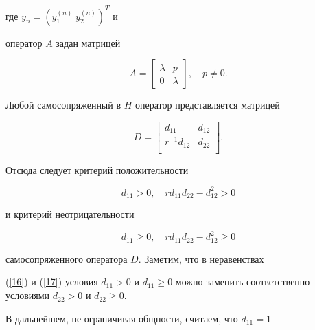 где $y_{n}=(y^{(n)}_{1}\;y^{(n)}_{2})^T$ и


оператор $A$ задан матрицей


\begin{equation}\label{15}


A=\begin{bmatrix}


\lambda &p\\0&\lambda


\end{bmatrix}


,\quad p\neq 0.


\end{equation}


Любой самосопряженный в $H$ оператор представляется матрицей


$$


D=\begin{bmatrix}


{d_{11}} & {d_{12}} \\


{r^{-1}d_{12}} & {d_{22}} \\


\end{bmatrix}.


$$


Отсюда следует критерий положительности


\begin{equation}\label{16}


d_{11} > 0,\quad r d_{11} d_{22}-d_{12}^2 > 0


\end{equation}


и критерий неотрицательности


\begin{equation}\label{17}


d_{11} \geqslant 0,\quad r d_{11} d_{22}-d_{12}^2 \geqslant 0


\end{equation}


самосопряженного оператора $D$. Заметим, что в неравенствах


(\ref{16}) и (\ref{17}) условия $d_{11} > 0$ и $d_{11} \geqslant


0$ можно заменить соответственно условиями $d_{22} > 0$ и $d_{22}


\geqslant 0$.





В дальнейшем, не ограничивая общности, считаем, что $d_{11}=1$


